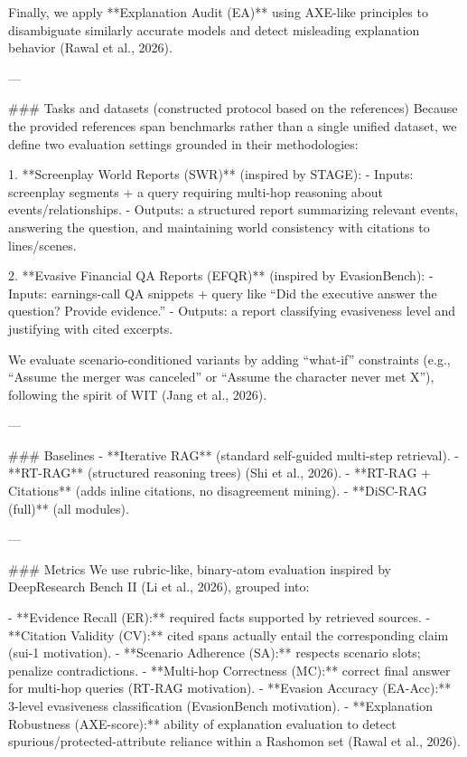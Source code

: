 Finally, we apply **Explanation Audit (EA)** using AXE-like principles to disambiguate similarly accurate models and detect misleading explanation behavior (Rawal et al., 2026).

---

### Tasks and datasets (constructed protocol based on the references)  
Because the provided references span benchmarks rather than a single unified dataset, we define two evaluation settings grounded in their methodologies:

1. **Screenplay World Reports (SWR)** (inspired by STAGE):  
   - Inputs: screenplay segments + a query requiring multi-hop reasoning about events/relationships.  
   - Outputs: a structured report summarizing relevant events, answering the question, and maintaining world consistency with citations to lines/scenes.

2. **Evasive Financial QA Reports (EFQR)** (inspired by EvasionBench):  
   - Inputs: earnings-call QA snippets + query like “Did the executive answer the question? Provide evidence.”  
   - Outputs: a report classifying evasiveness level and justifying with cited excerpts.

We evaluate scenario-conditioned variants by adding “what-if” constraints (e.g., “Assume the merger was canceled” or “Assume the character never met X”), following the spirit of WIT (Jang et al., 2026).

---

### Baselines  
- **Iterative RAG** (standard self-guided multi-step retrieval).  
- **RT-RAG** (structured reasoning trees) (Shi et al., 2026).  
- **RT-RAG + Citations** (adds inline citations, no disagreement mining).  
- **DiSC-RAG (full)** (all modules).  

---

### Metrics  
We use rubric-like, binary-atom evaluation inspired by DeepResearch Bench II (Li et al., 2026), grouped into:

- **Evidence Recall (ER):** required facts supported by retrieved sources.  
- **Citation Validity (CV):** cited spans actually entail the corresponding claim (sui-1 motivation).  
- **Scenario Adherence (SA):** respects scenario slots; penalize contradictions.  
- **Multi-hop Correctness (MC):** correct final answer for multi-hop queries (RT-RAG motivation).  
- **Evasion Accuracy (EA-Acc):** 3-level evasiveness classification (EvasionBench motivation).  
- **Explanation Robustness (AXE-score):** ability of explanation evaluation to detect spurious/protected-attribute reliance within a Rashomon set (Rawal et al., 2026).

